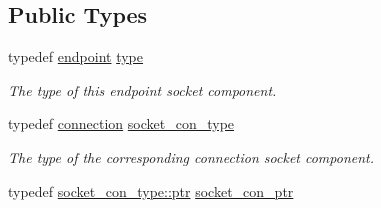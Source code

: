 \subsection*{Public Types}
\begin{DoxyCompactItemize}
\item 
typedef \hyperlink{classwebsocketpp_1_1transport_1_1asio_1_1tls__socket_1_1endpoint}{endpoint} \hyperlink{classwebsocketpp_1_1transport_1_1asio_1_1tls__socket_1_1endpoint_adc98054310e74703eb102760e85f5cd9}{type}\hypertarget{classwebsocketpp_1_1transport_1_1asio_1_1tls__socket_1_1endpoint_adc98054310e74703eb102760e85f5cd9}{}\label{classwebsocketpp_1_1transport_1_1asio_1_1tls__socket_1_1endpoint_adc98054310e74703eb102760e85f5cd9}

\begin{DoxyCompactList}\small\item\em The type of this endpoint socket component. \end{DoxyCompactList}\item 
typedef \hyperlink{classwebsocketpp_1_1transport_1_1asio_1_1tls__socket_1_1connection}{connection} \hyperlink{classwebsocketpp_1_1transport_1_1asio_1_1tls__socket_1_1endpoint_a690393b3da13e389cf025f88a3d38f3f}{socket\+\_\+con\+\_\+type}\hypertarget{classwebsocketpp_1_1transport_1_1asio_1_1tls__socket_1_1endpoint_a690393b3da13e389cf025f88a3d38f3f}{}\label{classwebsocketpp_1_1transport_1_1asio_1_1tls__socket_1_1endpoint_a690393b3da13e389cf025f88a3d38f3f}

\begin{DoxyCompactList}\small\item\em The type of the corresponding connection socket component. \end{DoxyCompactList}\item 
typedef \hyperlink{classwebsocketpp_1_1transport_1_1asio_1_1tls__socket_1_1connection_a2aa605c27a476eba644e062dc5bc4f6d}{socket\+\_\+con\+\_\+type\+::ptr} \hyperlink{classwebsocketpp_1_1transport_1_1asio_1_1tls__socket_1_1endpoint_ad0babd14e53524633840467d072710c3}{socket\+\_\+con\+\_\+ptr}
\end{DoxyCompactItemize}
